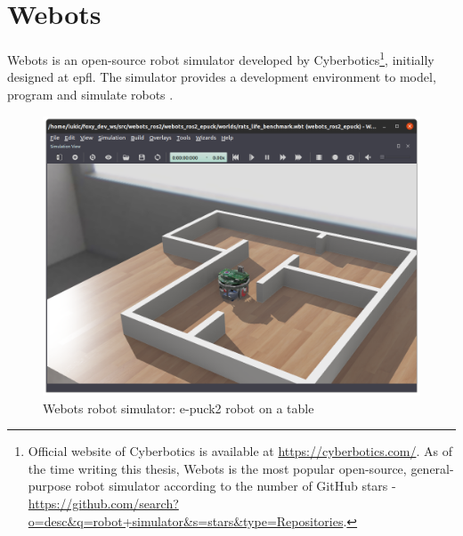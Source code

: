 \section{Webots}
Webots is an open-source robot simulator developed by Cyberbotics\footnote{Official website of Cyberbotics is available at \url{https://cyberbotics.com/}. As of the time writing this thesis, Webots is the most popular open-source, general-purpose robot simulator according to the number of GitHub stars - \url{https://github.com/search?o=desc&q=robot+simulator&s=stars&type=Repositories}.}, initially designed at \ac{epfl}. The simulator provides a development environment to model, program and simulate robots \cite{michel_cyberbotics_2004, michel_webots_1998, michel_cyberbotics_2014}.

\begin{figure}[H]
    \centering
    \includegraphics[width=\textwidth]{background/figures/webots.png}
    \caption{Webots robot simulator: e-puck2 robot on a table}
    \label{fig:background:webots}
\end{figure}

